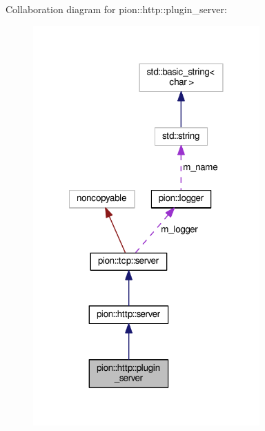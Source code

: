 Collaboration diagram for pion\-:\-:http\-:\-:plugin\-\_\-server\-:
\nopagebreak
\begin{figure}[H]
\begin{center}
\leavevmode
\includegraphics[width=246pt]{classpion_1_1http_1_1plugin__server__coll__graph}
\end{center}
\end{figure}
